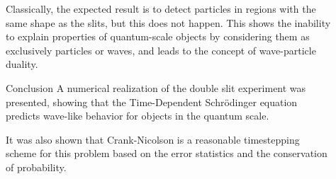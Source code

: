 \documentclass[final]{beamer}
\newlength{\sepwid}
\newlength{\onecolwid}
\newlength{\twocolwid}
\begin{document}
\begin{frame}[t]
\begin{columns}[t]
\begin{column}{\twocolwid}
\begin{columns}[t,totalwidth=\twocolwid]









\end{columns} %

\end{column} %

\begin{column}{\sepwid}\end{column} %

\begin{column}{\onecolwid} %

\begin{block}{}
	Classically, the expected result is to detect particles in regions with the same shape as the slits, but this does not happen. This shows the inability to explain properties of quantum-scale objects by considering them as exclusively particles or waves, and leads to the concept of wave-particle duality.
	
\end{block}
\begin{block}{Conclusion}
A numerical realization of the double slit experiment was presented, showing that the Time-Dependent Schr\"{o}dinger equation predicts wave-like behavior for objects in the quantum scale.\par
It was also shown that Crank-Nicolson is a reasonable timestepping scheme for this problem based on the error statistics and the conservation of probability.


\end{block}
\end{column}
\end{columns}
\end{frame}
\end{document}

